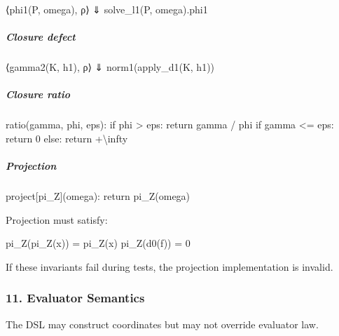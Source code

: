\documentclass[
]{article}
\newenvironment{Shaded}{\begin{snugshade}}{\end{snugshade}}
\newcommand{\NormalTok}[1]{\textcolor[rgb]{0.12,0.11,0.11}{#1}}
\begin{document}
\begin{Shaded}
\begin{Highlighting}[]
\NormalTok{⟨phi1(P, omega), ρ⟩ ⇓ solve\_l1(P, omega).phi1}
\end{Highlighting}
\end{Shaded}

\subparagraph{Closure defect}\label{closure-defect}

\begin{Shaded}
\begin{Highlighting}[]
\NormalTok{⟨gamma2(K, h1), ρ⟩ ⇓ norm1(apply\_d1(K, h1))}
\end{Highlighting}
\end{Shaded}

\subparagraph{Closure ratio}\label{closure-ratio}

\begin{Shaded}
\begin{Highlighting}[]
\NormalTok{ratio(gamma, phi, eps):}
\NormalTok{    if phi \textgreater{} eps:}
\NormalTok{        return gamma / phi}
\NormalTok{    if gamma \textless{}= eps:}
\NormalTok{        return 0}
\NormalTok{    else:}
\NormalTok{        return +\textbackslash{}infty}
\end{Highlighting}
\end{Shaded}

\subparagraph{Projection}\label{projection-1}

\begin{Shaded}
\begin{Highlighting}[]
\NormalTok{project[pi\_Z](omega):}
\NormalTok{    return pi\_Z(omega)}
\end{Highlighting}
\end{Shaded}

Projection must satisfy:

\begin{Shaded}
\begin{Highlighting}[]
\NormalTok{pi\_Z(pi\_Z(x)) = pi\_Z(x)}
\NormalTok{pi\_Z(d0(f)) = 0}
\end{Highlighting}
\end{Shaded}

If these invariants fail during tests, the projection implementation is invalid.

\subsubsection{11. Evaluator Semantics}\label{evaluator-semantics}

The DSL may construct coordinates but may not override evaluator law.
\end{document}

